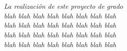 \chapter*{}
\begin{flushright}
\textit{La realización de este proyecto de grado \\
        blah blah blah blah blah blah blah blah \\
        blah blah blah blah blah blah blah blah \\
        blah blah blah blah blah blah blah blah \\ 
        blah blah blah blah blah blah blah blah \\
        }
    \end{flushright}
\newpage
